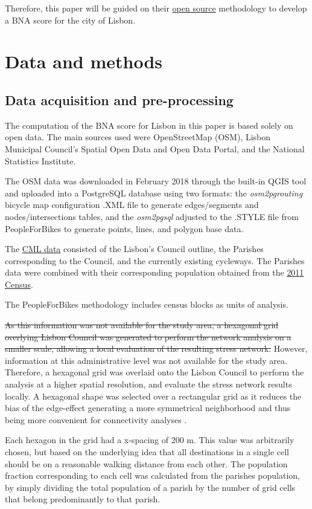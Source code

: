 \documentclass[information,article,submit,moreauthors,pdftex,10pt,a4paper]{mdpi}
\theoremstyle{mdpi}
\newcounter{ex}
\newcounter{re}
\theoremstyle{mdpidefinition}
\begin{document}
Therefore, this paper will be guided on their \href{https://github.com/azavea/pfb-network-connectivity}{open source} methodology to develop a BNA score for the city of Lisbon.

\section{Data and methods} \label {methods}

\subsection{Data acquisition and pre-processing} \label{data}

The computation of the BNA score for Lisbon in this paper is based solely on open data. The main sources used were OpenStreetMap (OSM), Lisbon Municipal Council's Spatial Open Data and Open Data Portal, and the National Statistics Institute. 

The OSM data was downloaded in February 2018 through the built-in QGIS tool and uploaded into a PostgreSQL database using two formats: the \textit{osm2pgrouting} bicycle map
configuration .XML file to generate edges/segments and nodes/intersections tables, and the \textit{osm2pgsql} adjusted to the .STYLE file from PeopleForBikes to generate points, lines, and polygon base data. 

The \href{http://geodados.cm-lisboa.pt/}{CML data} consisted of the Lisbon's Council outline, the Parishes corresponding to the Council, and the currently existing cycleways. The Parishes data were combined with their corresponding population obtained from the \href{http://censos.ine.pt/}{2011 Census}. 

The PeopleForBikes methodology includes census blocks as units of analysis. 
\begin{mycolorbox}[colback=yellow]
\sout{As this information was not available for the study area, a hexagonal grid overlying Lisbon Council was generated to perform the network analysis on a smaller scale, allowing a local evaluation of the resulting stress network.} However, information at this administrative level was not available for the study area. Therefore, a hexagonal grid was overlaid onto the Lisbon Council to perform the analysis at a higher spatial resolution, and evaluate the stress network results locally. A hexagonal shape was selected over a rectangular grid as it reduces the bias of the edge-effect generating a more symmetrical neighborhood and thus being more convenient for connectivity analyses \cite{Birch2007}.
\end{mycolorbox} 
Each hexagon in the grid had a x-spacing of 200 m. This value was arbitrarily chosen, but based on the underlying idea that all destinations in a single cell should be on a reasonable walking distance from each other. The population fraction corresponding to each cell was calculated from the parishes population, by simply dividing the total population of a parish by the number of grid cells that belong predominantly to that parish.
\end{document}
